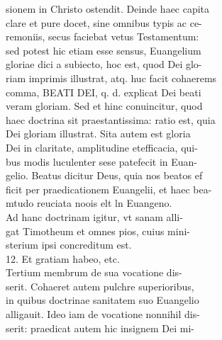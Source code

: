\documentclass{article}
\begin{document}
\begin{pages}
                sionem in Christo ostendit. Deinde haec capita \\
                clare et pure docet, sine omnibus typis ac ce- \\
                remoniis, secus faciebat vetus Testamentum: \\
                sed potest hic etiam esse sensus, Euangelium \\
                gloriae dici a subiecto, hoc est, quod Dei glo- \\
                riam imprimis illustrat, atq. huc facit cohaerems \\
                comma, BEATI DEI, q. d. explicat Dei beati \\
                veram gloriam. Sed et hinc conuincitur, quod \\
                haec doctrina sit praestantissima: ratio est, quia \\
                Dei gloriam illustrat. Sita autem est gloria \\
                Dei in claritate, amplitudine etefficacia, qui- \\
                bus modis luculenter sese patefecit in Euan- \\
                gelio. Beatus dicitur Deus, quia nos beatos ef \\
                ficit per praedicationem Euangelii, et haec bea- \\
                mtudo reuciata noois elt ln Euangeno. \\
                Ad hanc doctrinam igitur, vt sanam alli- \\
                gat Timotheum et omnes pios, cuius mini- \\
                sterium ipsi concreditum est. \\
                12. Et gratiam habeo, etc. \\
                Tertium membrum de sua vocatione dis- \\
                serit. Cohaeret autem pulchre superioribus, \\
                in quibus doctrinae sanitatem suo Euangelio \\
                alligauit. Ideo iam de vocatione nonnihil dis- \\
                serit: praedicat autem hic insignem Dei mi- \\

\end{pages}
\end{document}
